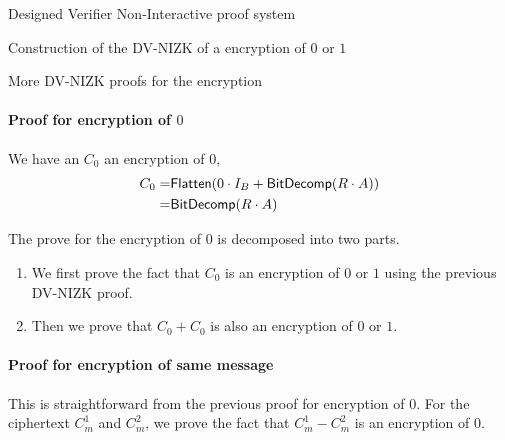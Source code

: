 \begin{section}{Designed Verifier Non-Interactive proof system}
\begin{subsection}{Construction of the DV-NIZK of a encryption of $0$ or $1$}
  \end{subsection}


  \begin{subsection}{More DV-NIZK proofs for the encryption}
    
    \paragraph{Proof for encryption of $0$}
    We have an $C_0$ an encryption of $0$, 
    \begin{align*}
      C_0  = & {\mathsf{Flatten}}( 0 \cdot I_B + {\mathsf{BitDecomp}}(R \cdot A))\\
      = & {\mathsf{BitDecomp}}(R \cdot A)
    \end{align*}

    The prove for the encryption of $0$ is decomposed into two parts.
    \begin{enumerate}
    \item We first prove the fact that $C_0$ is an encryption of $0$ or $1$ using the previous DV-NIZK proof.
    \item Then we prove that $C_0 + C_0$ is also an encryption of $0$ or $1$.
    \end{enumerate}

    \paragraph{Proof for encryption of same message}
    This is straightforward from the previous proof for encryption of $0$. For the ciphertext $C_m^1$ and $C_m^2$, we prove the fact that $C_m^1 - C_m^2$ is an encryption of $0$.

    
  \end{subsection}



\end{section}
